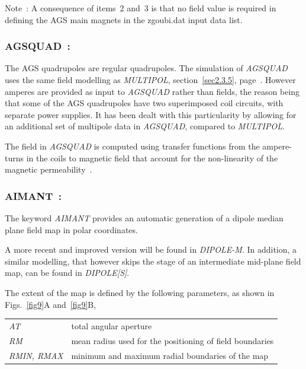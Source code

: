 \bigskip

  \noindent Note~: A consequence of  items~2 and~3 is that  no field value is required in defining the AGS main magnets in 
the  zgoubi.dat input data list. 




\newpage

\subsubsection*{AGSQUAD~:  \AGSQUADTitl} \label{AGSQUAD}
\medskip 

The AGS quadrupoles are regular quadrupoles. 
The simulation of  \textsl{AGSQUAD}  uses the same field modelling as \textsl{MULTIPOL}, 
section~\ref{sec2.3.5}, page~\pageref{sec2.3.5}.  However amperes are provided as input to 
 \textsl{AGSQUAD} rather than fields, the reason being that 
 some of the AGS quadrupoles  have two superimposed coil circuits, with separate power supplies. 
It has been dealt with this 
particularity by allowing  for an additional set of multipole data in \textsl{AGSQUAD}, compared to \textsl{MULTIPOL}. 

\bigskip

\noindent The field in \textsl{AGSQUAD} is computed using transfer functions from the ampere-turns in the coils to 
magnetic field that  account for the non-linearity of the magnetic permeability~\cite{MADXAGSModel}. 



\newpage



\subsubsection*{AIMANT~:  \AIMANTTitl}\label{AIMANT}
\medskip

The keyword \textsl{AIMANT} provides an automatic
generation of a dipole median plane field map in polar coordinates. 

\medskip
\noindent A more recent and improved version will be 
found in \textsl{DIPOLE-M}. In addition, a similar modelling, that however skips 
the stage of an intermediate mid-plane field map, can be found in  \textsl{DIPOLE[S]}.

\medskip
\noindent The extent of the map is defined by the 
following parameters, as shown in Figs.~\ref{fig9}A and~\ref{fig9}B, 

 \begin{tabular}{>{\sl}l!{~:}l}
	 AT &  total angular aperture\\
	 RM & mean radius used for the positioning of field boundaries\\
	 RMIN, RMAX
	    &  minimum and maximum radial boundaries of the map 
 \end{tabular}
\bigskip


